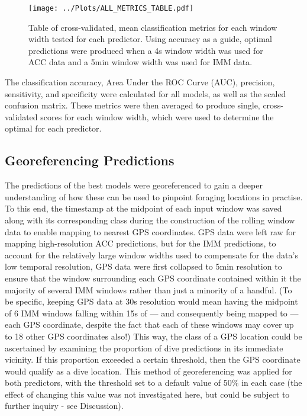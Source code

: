 \documentclass[11pt]{article}
\begin{document}
    
    \begin{figure}[t!]
	    \centering\texttt{[image: ../Plots/ALL\_METRICS\_TABLE.pdf]}
	    \caption{Table of cross-validated, mean classification metrics for each window width tested for each predictor. Using accuracy as a guide, optimal predictions were produced when a 4s window width was used for ACC data and a 5min window width was used for IMM data.}
    \end{figure}
    
    The classification accuracy, Area Under the ROC Curve (AUC), precision, sensitivity, and specificity were calculated for all models, as well as the scaled confusion matrix. These metrics were then averaged to produce single, cross-validated scores for each window width, which were used to determine the optimal for each predictor. 
    
    \subsection{Georeferencing Predictions}
    
    The predictions of the best models were georeferenced to gain a deeper understanding of how these can be used to pinpoint foraging locations in practise. To this end, the timestamp at the midpoint of each input window was saved along with its corresponding class during the construction of the rolling window data to enable mapping to nearest GPS coordinates. GPS data were left raw for mapping high-resolution ACC predictions, but for the IMM predictions, to account for the relatively large window widths used to compensate for the data's low temporal resolution, GPS data were first collapsed to 5min resolution to ensure that the window surrounding each GPS coordinate contained within it the majority of several IMM windows rather than just a minority of a handful. (To be specific, keeping GPS data at 30s resolution would mean having the midpoint of 6 IMM windows falling within 15s of — and consequently being mapped to — each GPS coordinate, despite the fact that each of these windows may cover up to 18 other GPS coordinates also!) This way, the class of a GPS location could be ascertained by examining the proportion of dive predictions in its immediate vicinity. If this proportion exceeded a certain threshold, then the GPS coordinate would qualify as a dive location. This method of georeferencing was applied for both predictors, with the threshold set to a default value of 50\% in each case (the effect of changing this value was not investigated here, but could be subject to further inquiry - see Discussion). 
    
\end{document}
